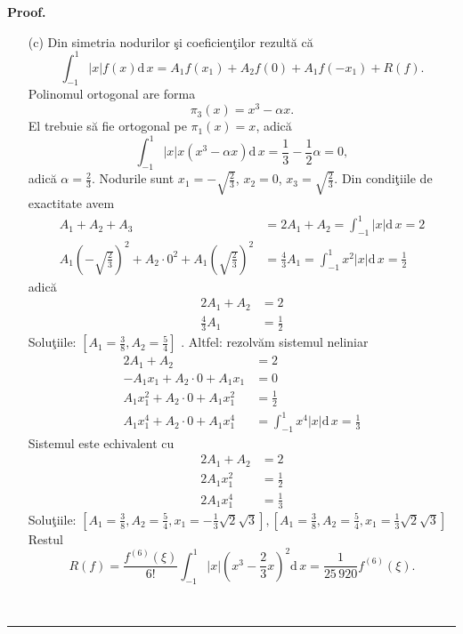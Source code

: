 \documentclass{article}%
\newenvironment{proof}[1][Proof]{\noindent\textbf{#1.} }{\ \rule{0.5em}{0.5em}}
\begin{document}
\begin{proof}
\begin{enumerate}
\item[(c)] Din simetria nodurilor \c{s}i coeficien\c{t}ilor rezult\u{a} c\u{a}%
\[
\int_{-1}^{1}\left\vert x\right\vert f(x)\mathrm{d}\,x=A_{1}f(x_{1}%
)+A_{2}f(0)+A_{1}f(-x_{1})+R(f).
\]
Polinomul ortogonal are forma
\[
\pi_{3}(x)=x^{3}-\alpha x.
\]
El trebuie s\u{a} fie ortogonal pe $\pi_{1}(x)=x$, adic\u{a}%
\[
\int_{-1}^{1}\left\vert x\right\vert x\left(  x^{3}-\alpha x\right)
\mathrm{d}\,x=\frac{1}{3}-\frac{1}{2}\alpha=0,
\]
adic\u{a} $\alpha=\frac{2}{3}$. Nodurile sunt $x_{1}=-\sqrt{\frac{2}{3}}$,
$x_{2}=0$, $x_{3}=\sqrt{\frac{2}{3}}$. Din condi\c{t}iile de exactitate avem%
\begin{align*}
A_{1}+A_{2}+A_{3}  &  =2A_{1}+A_{2}=\int_{-1}^{1}\left\vert x\right\vert
\mathrm{d}\,x=2\\
A_{1}\left(  -\sqrt{\frac{2}{3}}\right)  ^{2}+A_{2}\cdot0^{2}+A_{1}\left(
\sqrt{\frac{2}{3}}\right)  ^{2}  &  =\frac{4}{3}A_{1}=\int_{-1}^{1}%
x^{2}\left\vert x\right\vert \mathrm{d}\,x=\frac{1}{2}%
\end{align*}
adic\u{a}%
\begin{align*}
2A_{1}+A_{2}  &  =2\\
\frac{4}{3}A_{1}  &  =\frac{1}{2}%
\end{align*}
Solu\c{t}iile: $\left[  A_{1}=\frac{3}{8},A_{2}=\frac{5}{4}\right]  $ .
Altfel: rezolv\u{a}m sistemul neliniar%
\begin{align*}
2A_{1}+A_{2}  &  =2\\
-A_{1}x_{1}+A_{2}\cdot0+A_{1}x_{1}  &  =0\\
A_{1}x_{1}^{2}+A_{2}\cdot0+A_{1}x_{1}^{2}  &  =\frac{1}{2}\\
A_{1}x_{1}^{4}+A_{2}\cdot0+A_{1}x_{1}^{4}  &  =\int_{-1}^{1}x^{4}\left\vert
x\right\vert \mathrm{d}\,x=\frac{1}{3}%
\end{align*}
Sistemul este echivalent cu%
\begin{align*}
2A_{1}+A_{2}  &  =2\\
2A_{1}x_{1}^{2}  &  =\frac{1}{2}\\
2A_{1}x_{1}^{4}  &  =\frac{1}{3}%
\end{align*}
Solu\c{t}iile: $\left[  A_{1}=\frac{3}{8},A_{2}=\frac{5}{4},x_{1}=-\frac{1}%
{3}\sqrt{2}\sqrt{3}\right]  ,\left[  A_{1}=\frac{3}{8},A_{2}=\frac{5}{4}%
,x_{1}=\frac{1}{3}\sqrt{2}\sqrt{3}\right]  \allowbreak$ \newline Restul%
\[
R(f)=\frac{f^{(6)}(\xi)}{6!}\int_{-1}^{1}\left\vert x\right\vert \left(
x^{3}-\frac{2}{3}x\right)  ^{2}\mathrm{d}\,x=\frac{1}{25\,920}f^{(6)}(\xi).
\]

\end{enumerate}

\end{proof}
\end{document}
